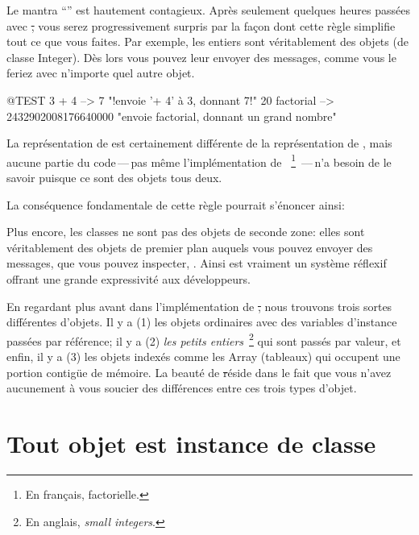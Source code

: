 \documentclass[a4paper,10pt,twoside]{book}
\begin{document}

Le mantra ``\mantra'' est hautement contagieux.
Après seulement quelques heures passées avec \st, vous serez progressivement surpris par la façon dont cette règle simplifie tout ce que vous faites.
Par exemple, les entiers sont véritablement des objets (de classe Integer). Dès lors vous pouvez leur envoyer des messages, comme vous le feriez avec n'importe quel autre objet.

\begin{code}{@TEST}
3 + 4            --> 7    "!envoie '+ 4' à 3, donnant 7!"
20 factorial  --> 2432902008176640000   "envoie factorial, donnant un grand nombre"
\end{code}

La représentation de  est certainement différente de la représentation de , mais aucune partie du code\,---\,pas même l'implémentation de 
~\footnote{En français, factorielle.}
\,---\,n'a besoin de le savoir puisque ce sont des objets tous deux.

La conséquence fondamentale de cette règle pourrait s'énoncer ainsi:

Plus encore, les classes ne sont pas des objets de seconde zone: elles sont véritablement des objets de premier plan auquels vous pouvez envoyer des messages, que vous pouvez inspecter, \etc.
Ainsi \pharo est vraiment un système réflexif offrant une grande expressivité
aux développeurs.

En regardant plus avant dans l'implémentation de \st, nous trouvons
trois sortes différentes d'objets. Il y a (1) les objets ordinaires
avec des variables d'instance passées par référence; il y a (2)
\emph{les petits entiers}~\footnote{En anglais, \emph{small
    integers}.} qui sont passés par valeur, et enfin, il y a (3) les
objets 
indexés comme les Array (tableaux) qui occupent une portion contig\"ue de mémoire. La beauté de \st réside 
dans le fait que vous n'avez aucunement à vous soucier des différences entre ces trois types
d'objet.


\section{Tout objet est instance de classe}

\end{document}
